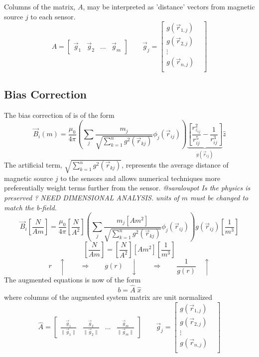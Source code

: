 \documentclass[a4paper]{article}
\begin{document}
Columns of the matrix, $A$, may be interpreted as 'distance' vectors  from
magnetic source $j$ to each sensor.
\[
A = 
\begin{bmatrix}
 \vec{g}_1
 &
 \vec{g}_2
 &
 ...
 &
 \vec{g}_m
\end{bmatrix}
\qquad
\vec{g}_j
 = 
\begin{bmatrix} 
g(\vec{r}_{1,j}) & \\
g(\vec{r}_{2,j}) & \\
\vdots           & \\
g(\vec{r}_{n,j}) & \\
\end{bmatrix} 
\]


\subsection{Bias Correction }
The bias correction of \cite{Gorodnitsky} is of the form
 \[
\vec{B}_i(m)=\frac{\mu_{0}}{4\pi}
  \left(\sum_j  \frac{m_j}{\sqrt{\sum_{k=1}^n  g^2 (\vec{r}_{kj})}}  \phi_j(\vec{r}_{ij})\right)
  \underbrace{
   \left[
       \frac{r_{z_{ij}}^{2}}{r^{5}_{ij}}-\frac{1}{r^{3}_{ij}}
   \right]
   }_{g(\vec{r}_{ij})}
 \hat{z}
\]
The artificial term, $\sqrt{\sum_{k=1}^n  g^2 (\vec{r}_{kj})}$,
represents the average distance of magnetic source $j$ to the sensors and allows numerical techniques more preferentially weight terms further from the sensor.
\textit{\color{red} @saraloupot
Is the physics is preserved ? NEED DIMENSIONAL ANALYSIS.
units of $m$ must be changed to match the b-field. } 
\begin{equation}
\vec{B}_i \left[\frac{N}{Am}\right] = \frac{\mu_{0}}{4\pi} \left[\frac{N}{A^{2}}\right] \left(\sum_j  \frac{m_{j} [Am^2]}{\sqrt{\sum_{k=1}^n  g^2 (\vec{r}_{kj})}}  \phi_j(\vec{r}_{ij})\right)g(\vec{r}_{ij})\left[\frac{1}{m^3}\right]
\end{equation}
\begin{equation}
\left[\frac{N}{Am}\right] = \left[\frac{N}{A^2}\right]\left[A m^2\right]\left[\frac{1}{m^3}\right]
\end{equation}
\[
  r \quad \uparrow 
\qquad \Rightarrow \qquad
  g(r) \quad \downarrow 
\qquad \Rightarrow \qquad
  \frac{1}{g(r)} \quad \uparrow 
\]
The augmented equations is now of the form
\[
b = \hat{A} \; \hat{x}
\]
where columns of the augmented system matrix are unit normalized
\[
\hat{A} = 
\begin{bmatrix}
 \frac{\vec{g}_1}{\|\vec{g}_1\|}
 &
 \frac{\vec{g}_2}{\|\vec{g}_2\|}
 &
 ...
 &
 \frac{\vec{g}_m}{\|\vec{g}_m\|}
\end{bmatrix}
\qquad
\vec{g}_j
 = 
\begin{bmatrix} 
g(\vec{r}_{1,j}) & \\
g(\vec{r}_{2,j}) & \\
\vdots           & \\
g(\vec{r}_{n,j}) & \\
\end{bmatrix} 
\]
\end{document}
